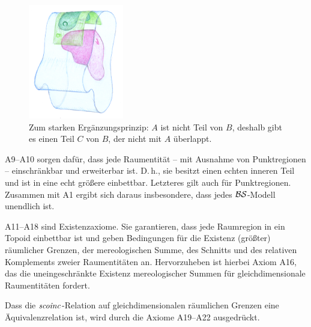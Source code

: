 \begin{figure}[ht]
    \centering
    \includegraphics[height=5cm]{abb/supplementation.png}
    \caption[Zum starken Ergänzungsprinzip]{Zum starken Ergänzungsprinzip: $A$ ist nicht Teil von $B$, deshalb gibt es einen Teil $C$ von $B$, der nicht mit $A$ überlappt.}
    \label{fig:supplementation}
\end{figure}



A9--A10
sorgen dafür, dass jede Raumentität -- mit Ausnahme von Punktregionen -- einschränkbar und erweiterbar ist. D.\,h., sie besitzt einen echten inneren Teil und ist in eine echt größere einbettbar. Letzteres gilt auch für Punktregionen.
Zusammen mit A1 ergibt sich daraus insbesondere, dass jedes $\mathcal{BS}$-Modell unendlich ist.

A11--A18
sind Existenzaxiome. 
Sie garantieren, dass jede Raumregion in ein Topoid einbettbar ist und geben Bedingungen für die Existenz (größter) räumlicher Grenzen, der mereologischen Summe, des Schnitts und des relativen Komplements zweier Raumentitäten an.
Hervorzuheben ist hierbei Axiom A16, das die uneingeschränkte Existenz mereologischer Summen für gleichdimensionale Raumentitäten fordert.

Dass
die $\mathit{scoinc}$-Relation auf gleichdimensionalen räumlichen Grenzen eine Äquivalenzrelation ist, wird durch die Axiome A19--A22 ausgedrückt.

